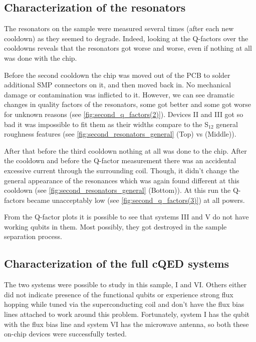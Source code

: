 \documentclass[12pt, twoside]{report}
\numberwithin{equation}{section}
\begin{document}
\subsection{Characterization of the resonators}

The resonators on the sample were measured several times (after each new cooldown) as they seemed to degrade. Indeed, looking at the Q-factors over the cooldowns reveals that the resonators got worse and worse, even if nothing at all was done with the chip.

Before the second cooldown the chip was moved out of the PCB to solder additional SMP connectors on it, and then moved back in. No mechanical damage or contamination was inflicted to it. However, we can see dramatic changes in quality factors of the resonators, some got better and some got worse for unknown reasons (see \autoref{fig:second_q_factors(2)}). Devices II and III got so bad it was impossible to fit them as their widths compare to the S$_{12}$ general roughness features (see \autoref{fig:second_resonators_general} (Top) vs (Middle)).

After that before the third cooldown nothing at all was done to the chip. After the cooldown and before the Q-factor measurement there was an accidental excessive current through the surrounding coil. Though, it didn't change the general appearance of the resonances which was again found different at this cooldown (see \autoref{fig:second_resonators_general} (Bottom)). At this run the Q-factors became unacceptably low (see \autoref{fig:second_q_factors(3)}) at all powers. 

From the Q-factor plots it is possible to see that systems III and V do not have working qubits in them. Most possibly, they got destroyed in the sample separation process.


\subsection{Characterization of the full cQED systems}

The two systems were possible to study in this sample, I and VI. Others either did not indicate presence of the functional qubits or experience strong flux hopping while tuned via the superconducting coil and don't have the flux bias lines attached to work around this problem. Fortunately, system I has the qubit with the flux bias line and system VI has the microwave antenna, so both these on-chip devices were successfully tested.
\end{document}
